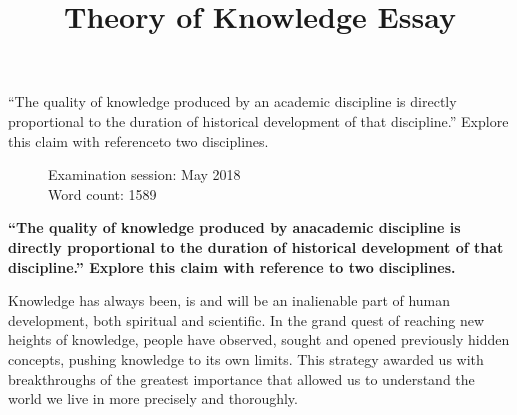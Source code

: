 \documentclass[12pt,a4paper]{article}
\title{Theory of Knowledge Essay}
\author{}
\date{}
\begin{document}

\maketitle

\doublespacing

\begin{center}

  ``The quality of knowledge produced by an academic discipline is directly proportional to the duration of historical development of that discipline.'' Explore this claim with referenceto two disciplines.

\end{center}

\begin{figure}[b]
  \begin{flushleft}
    Examination session: May 2018\\
    Word count: 1589\\
  \end{flushleft}
\end{figure}

\newpage
{}
\begin{center}
  \textbf{``The quality of knowledge produced by anacademic discipline is directly proportional to the duration of historical development of that discipline.'' Explore this claim with reference to two disciplines.}
\end{center}

Knowledge has always been, is and will be an inalienable part of human development, both spiritual and scientific. In the grand quest of reaching new heights of knowledge, people have observed, sought and opened previously hidden concepts, pushing knowledge to its own limits. This strategy awarded us with breakthroughs of the greatest importance that allowed us to understand the world we live in more precisely and thoroughly. \\
\end{document}

